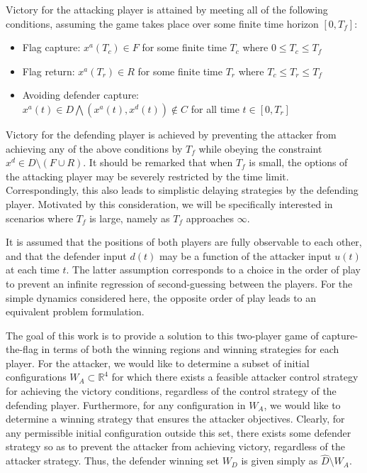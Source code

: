 \documentclass[letterpaper, 10 pt, conference]{ieeeconf}  %
\numberwithin{algorithm}{section}
\begin{document}
Victory for the attacking player is attained by meeting all of the following conditions, assuming the game takes place over some finite time horizon $[0, T_f]$:
\begin{itemize}
\item{Flag capture: $x^a(T_c) \in F$ for some finite time $T_c$ where $0 \leq T_c \leq T_f$ }
\item{Flag return:  $x^a(T_r) \in R$ for some finite time $T_r $ where $T_c \leq T_r \leq T_f$}
\item{Avoiding defender capture: \\
$x^a(t) \in D \bigwedge (x^a(t), x^d(t)) \not \in C$ for all time $t \in [0, T_r] $} 
\end{itemize}
Victory for the defending player is achieved by preventing the attacker from achieving any of the above conditions by $T_f$ while obeying the constraint $x^d \in D \setminus (F \cup R)$.  It should be remarked that when $T_f$ is small, the options of the attacking player may be severely restricted by the time limit.  Correspondingly, this also leads to simplistic delaying strategies by the defending player.  Motivated by this consideration, we will be specifically interested in scenarios where $T_f$ is large, namely as $T_f$ approaches $\infty$.

It is assumed that the positions of both players are fully observable to each other, and that the defender input $d(t)$ may be a function of the attacker input $u(t)$ at each time $t$.  The latter assumption corresponds to a choice in the order of play to prevent an infinite regression of second-guessing between the players.  For the simple dynamics considered here, the opposite order of play leads to an equivalent problem formulation.

The goal of this work is to provide a solution to this two-player game of capture-the-flag in terms of both the winning regions and winning strategies for each player.  For the attacker, we would like to determine a subset of initial configurations $W_A \subset \mathbb{R}^4$ for which there exists a feasible attacker control strategy for achieving the victory conditions, regardless of the control strategy of the defending player.  Furthermore, for any configuration in $W_A$, we would like to determine a winning strategy that ensures the attacker objectives.  Clearly, for any permissible initial configuration outside this set, there exists some defender strategy so as to prevent the attacker from achieving victory, regardless of the attacker strategy.  Thus, the defender winning set $W_D$ is given simply as $\hat{D} \setminus W_A$.  
\end{document}
